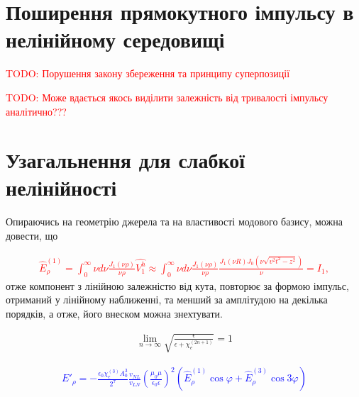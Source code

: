 \section{Поширення прямокутного імпульсу в нелінійному середовищі}

\textcolor{red} {TODO: Порушення закону збереження та принципу суперпозиції}

\textcolor{red} {TODO: Може вдається якось виділити залежність від 
тривалості імпульсу аналітично???}

\section{Узагальнення для слабкої нелінійності}

Опираючись на геометрію джерела та на властивості модового базису, можна 
довести, що 

\textcolor{red} { \begin{equation} \begin{aligned} \label{eq:erho_norm}
\hat{E}_\rho^{(1)} = \int_0^\infty \nu d \nu 
\frac{J_1(\nu \rho)}{\nu \rho} \hat{V_1^h} \approx
\int_0^\infty \nu d \nu \frac{J_1(\nu \rho)}{\nu \rho} 
\frac{J_1(\nu R) J_0(\nu \sqrt{v^2t^2-z^2})}{\nu} = I_1,
\end{aligned} \end{equation} }
%
отже компонент з лінійною залежністю від кута, повторює за формою 
імпульс, отриманий у лінійному наближенні, та менший за амплітудою на 
декілька порядків, а отже, його внеском можна знехтувати.

\begin{equation*} \begin{aligned}
\lim_{n \to \infty} 
\sqrt{ \frac{\epsilon}{ \epsilon + \chi_e^{(2n+1)}} } = 1
\end{aligned} \end{equation*}

\textcolor{blue} { \begin{equation*} \begin{aligned}
E'_\rho = - \frac{\epsilon_0 \chi_e^{(3)} A_0^3}{2^7}
\frac{v_{NL}}{v_{LN}}
\left( \frac{\mu_0 \mu}{\epsilon_0 \epsilon} \right)^2
\left(\hat{E}_\rho^{(1)} \cos \varphi +
\hat{E}_\rho^{(3)} \cos 3 \varphi \right)
\end{aligned} \end{equation*} }

